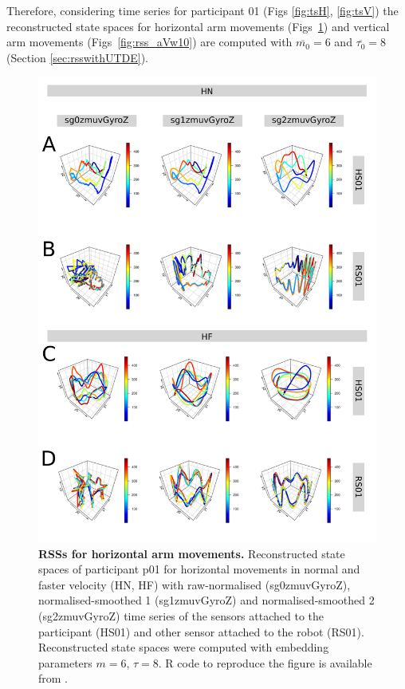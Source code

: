 Therefore, considering time series for participant 01 
(Figs \ref{fig:tsH}, \ref{fig:tsV}) the reconstructed state spaces
for horizontal arm movements (Figs~\ref{fig:rss_aHw10}) and
 vertical arm movements  (Figs~\ref{fig:rss_aVw10}) 
are computed with $\overline{m_0}=6$ and $\overline{\tau_0}=8$ 
(Section \ref{sec:rsswithUTDE}).
\begin{figure}[!h]
\centering
\includegraphics[height=0.85\textheight]{rss_aH}
\caption{
	{\bf RSSs for horizontal arm movements.}
	Reconstructed state spaces %
	of participant p01 for horizontal movements in normal and faster 
	velocity (HN, HF) with raw-normalised (sg0zmuvGyroZ), 
	normalised-smoothed 1 (sg1zmuvGyroZ) and 
	normalised-smoothed 2 (sg2zmuvGyroZ) time series of the 
	sensors attached to the participant (HS01) and other sensor 
	attached to the robot (RS01).	
	Reconstructed state spaces were computed with 
	embedding parameters $m=6$, $\tau=8$.
	R code to reproduce the figure is available from \cite{hwum2018}.
        }
    \label{fig:rss_aHw10}
\end{figure}
